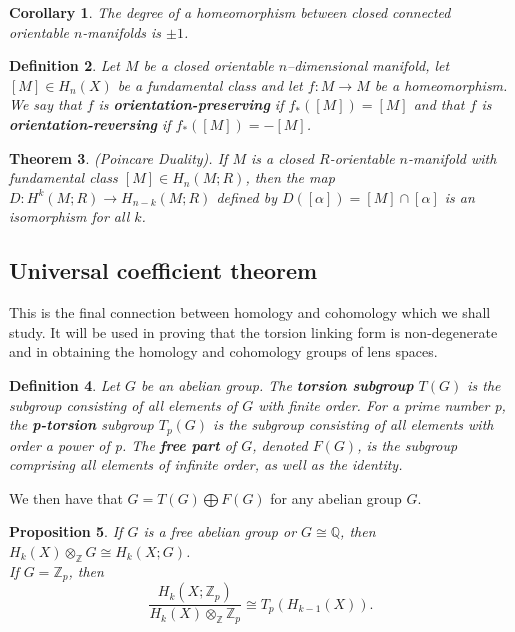 \documentclass{article}
\newtheorem{theorem}{Theorem}[section]
\newtheorem{definition}[theorem]{Definition}
\newtheorem{proposition}[theorem]{Proposition}
\newtheorem{corollary}[theorem]{Corollary}
\begin{document}
\begin{corollary}
The degree of a homeomorphism between closed connected orientable $n$-manifolds is $\pm 1$.
\end{corollary}

\begin{definition}
Let $M$ be a closed orientable $n$--dimensional manifold, let $[M]\in H_n(X)$ be a fundamental class and let $f\colon M\to M$ be a homeomorphism. We say that $f$ is \textbf{orientation-preserving} if $f_*([M])=[M]$ and that $f$ is \textbf{orientation-reversing} if $f_*([M])=-[M]$.
\end{definition}




\begin{theorem}
(Poincare Duality). If $M$ is a closed $R$-orientable $n$-manifold with fundamental class $[M]\in H_n(M;R)$, then the map $D\colon H^k(M;R)\to H_{n-k}(M;R)$ defined by $D([\alpha])=[M]\cap[\alpha]$ is an isomorphism for all $k$.
\end{theorem}





\subsection{Universal coefficient theorem}
This is the final connection between homology and cohomology which we shall study. It will be used in proving that the torsion linking form is non-degenerate and in obtaining the homology and cohomology groups of lens spaces.

\begin{definition}
Let $G$ be an abelian group. The \textbf{torsion subgroup} $T(G)$ is the subgroup consisting of all elements of $G$ with finite order. For a prime number p, the \textbf{p-torsion} subgroup $T_p(G)$ is the subgroup consisting of all elements with order a power of p. The \textbf{free part} of $G$, denoted $F(G)$, is the subgroup comprising all elements of infinite order, as well as the identity.
\end{definition}

\noindent We then have that $G=T(G)\bigoplus F(G)$ for any abelian group $G$.

\begin{proposition}
If $G$ is a free abelian group or $G\cong\mathbb{Q}$, then $H_k(X)\otimes_\mathbb{Z}G\cong H_k(X;G)$.\\
If $G=\mathbb{Z}_p$, then \[\frac{H_k(X;\mathbb{Z}_p)}{H_k(X)\otimes_\mathbb{Z}\mathbb{Z}_p}\cong T_p(H_{k-1}(X)).\]
\end{proposition}
\end{document}
